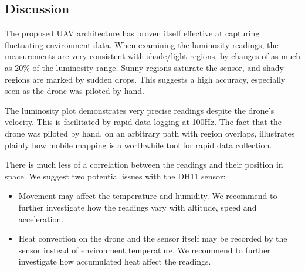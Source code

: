 \pagebreak




  



\subsection{Discussion}

The proposed UAV architecture has proven itself effective at capturing fluctuating environment data. When examining the luminosity readings, the measurements are very consistent with shade/light regions, by changes of as much as 20\% of the luminosity range. Sunny regions saturate the sensor, and shady regions are marked by sudden drops. This suggests a high accuracy, especially seen as the drone was piloted by hand. 

The luminosity plot demonstrates very precise readings despite the drone's velocity. This is facilitated by rapid data logging at 100Hz. The fact that the drone was piloted by hand, on an arbitrary path with region overlaps, illustrates plainly how mobile mapping is a worthwhile tool for rapid data collection.

There is much less of a correlation between the readings and their position in space. We suggest two potential issues with the DH11 sensor:
\begin{itemize}
    \item Movement may affect the temperature and humidity. We recommend to further investigate how the readings vary with altitude, speed and acceleration.
    \item Heat convection on the drone and the sensor itself may be recorded by the sensor instead of environment temperature. We recommend to further investigate how accumulated heat affect the readings.
\end{itemize}

